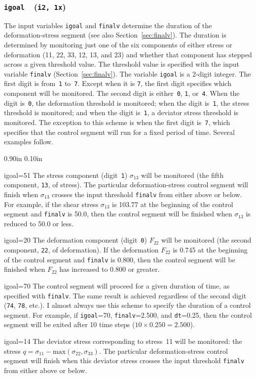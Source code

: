 \documentclass[letterpaper,11pt]{article}
\newcommand{\Var}[2]{\texttt{#1}\ \  (\texttt{#2})}
\newlength{\Labelwidth}
\newcommand{\Entrylabel}[1]{\makebox[\Labelwidth][r]{\texttt{#1}}}
\newenvironment{Options}
{\begin{list}{}{%
\renewcommand{\makelabel}{\Entrylabel}%
\setlength{\leftmargin} {0.90in}%
\setlength{\rightmargin}{0.00in}%
\setlength{\labelsep}   {0.10in}%
\setlength{\labelwidth} {\Labelwidth}%
}}
{\end{list}}
\begin{document}
\subsubsection[\texttt{igoal}]{\Var{igoal}{i2, 1x}}\label{sec:igoal}
The input variables \texttt{igoal} and \texttt{finalv} determine the
duration of the deforma\-tion-stress segment
(see also Section~\ref{sec:finalv}).
The duration is determined by monitoring just one of the six components
of either stress or deformation (\textrm{11}, \textrm{22}, 
\textrm{33}, \textrm{12},
\textrm{13}, and \textrm{23}) and whether that component has stepped across
a given threshold value.
The threshold value is specified with the input variable \texttt{finalv}
(Section~\ref{sec:finalv}).
The variable \texttt{igoal} is a 2-digit integer.
The first digit is from~\texttt{1} to~\texttt{7}.
Except when it is \texttt{7}, 
the first digit specifies which component will be monitored.
The second digit is either~\texttt{0}, \texttt{1}, or~\texttt{4}.
When the digit is~\texttt{0}, the deformation threshold is monitored;
when the digit is~\texttt{1}, the stress threshold is monitored;
and when the digit is~\texttt{1}, a deviator stress threshold is monitored.
The exception to this scheme is when the first digit is~\texttt{7},
which specifies that the control segment will run for a fixed period
of time.
Several examples follow.
\begin{Options}
\item[igoal=51]
The stress component (digit~\texttt{1}) $\sigma_{13}$ will be monitored
(the fifth component, \texttt{13}, of stress).
The particular deformation-stress control segment will finish
when $\sigma_{13}$ crosses the input
threshold \texttt{finalv} from either above or
below.  For example, if the shear stress $\sigma_{13}$ is 103.77
at the beginning of the control segment and \texttt{finalv} is
50.0, then the control segment will be finished when $\sigma_{13}$
is reduced to 50.0 or less.
\item[igoal=20]
The deformation component (digit~\texttt{0}) $F_{22}$ will be monitored
(the second component, \texttt{22}, of deformation).
If the deformation $F_{22}$ is 0.745 at the beginning of
the control segment and \texttt{finalv} is 0.800,
then the control segment will be finished when  $F_{22}$ has increased
to 0.800 or greater.
\item[igoal=70]
The control segment will proceed for a given duration of time,
as specified with \texttt{finalv}.
The same result is achieved regardless of the second digit (\texttt{74},
\texttt{78}, etc.).
I almost always use this scheme to specify the duration of a control segment.
For example, if \texttt{igoal}=70, \texttt{finalv}=2.500, and 
\texttt{dt}=0.25, then the control segment will be exited after 10 time
steps ($10 \times 0.250 = 2.500$).
\item[igoal=14]
The deviator stress corresponding to stress~11 will be monitored:
the stress $q=\sigma_{11} - \text{max}(\sigma_{22},\sigma_{33})$.
The particular deformation-stress control segment will finish
when this deviator stress crosses the input
threshold \texttt{finalv} from either above or
below.
\end{Options}
\end{document}
